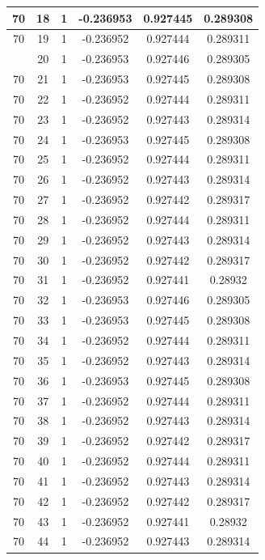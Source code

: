 \documentclass[12pt,a4paper]{article}
\numberwithin{equation}{section}
\numberwithin{figure}{section}
\numberwithin{table}{section}
\begin{document}
\begin{longtable}{|c|c|c|c|c|c|}
70 & 18 & 1 & -0.236953 & 0.927445 & 0.289308 \\ \hline
70 & 19 & 1 & -0.236952 & 0.927444 & 0.289311 \\ \hline
\pagebreak
70 & 20 & 1 & -0.236953 & 0.927446 & 0.289305 \\ \hline
70 & 21 & 1 & -0.236953 & 0.927445 & 0.289308 \\ \hline
70 & 22 & 1 & -0.236952 & 0.927444 & 0.289311 \\ \hline
70 & 23 & 1 & -0.236952 & 0.927443 & 0.289314 \\ \hline
70 & 24 & 1 & -0.236953 & 0.927445 & 0.289308 \\ \hline
70 & 25 & 1 & -0.236952 & 0.927444 & 0.289311 \\ \hline
70 & 26 & 1 & -0.236952 & 0.927443 & 0.289314 \\ \hline
70 & 27 & 1 & -0.236952 & 0.927442 & 0.289317 \\ \hline
70 & 28 & 1 & -0.236952 & 0.927444 & 0.289311 \\ \hline
70 & 29 & 1 & -0.236952 & 0.927443 & 0.289314 \\ \hline
70 & 30 & 1 & -0.236952 & 0.927442 & 0.289317 \\ \hline
70 & 31 & 1 & -0.236952 & 0.927441 & 0.28932 \\ \hline
70 & 32 & 1 & -0.236953 & 0.927446 & 0.289305 \\ \hline
70 & 33 & 1 & -0.236953 & 0.927445 & 0.289308 \\ \hline
70 & 34 & 1 & -0.236952 & 0.927444 & 0.289311 \\ \hline
70 & 35 & 1 & -0.236952 & 0.927443 & 0.289314 \\ \hline
70 & 36 & 1 & -0.236953 & 0.927445 & 0.289308 \\ \hline
70 & 37 & 1 & -0.236952 & 0.927444 & 0.289311 \\ \hline
70 & 38 & 1 & -0.236952 & 0.927443 & 0.289314 \\ \hline
70 & 39 & 1 & -0.236952 & 0.927442 & 0.289317 \\ \hline
70 & 40 & 1 & -0.236952 & 0.927444 & 0.289311 \\ \hline
70 & 41 & 1 & -0.236952 & 0.927443 & 0.289314 \\ \hline
70 & 42 & 1 & -0.236952 & 0.927442 & 0.289317 \\ \hline
70 & 43 & 1 & -0.236952 & 0.927441 & 0.28932 \\ \hline
70 & 44 & 1 & -0.236952 & 0.927443 & 0.289314 \\ \hline

\end{longtable}
\end{document}
